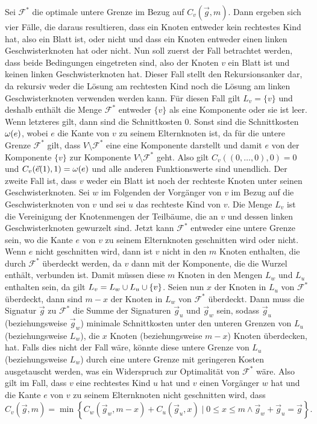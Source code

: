 Sei $\mathcal{F}^*$ die optimale untere Grenze im Bezug auf $C_v(\vec{g}, m)$. Dann ergeben sich vier Fälle, die daraus resultieren, dass ein Knoten entweder kein rechtestes Kind hat, also ein Blatt ist, oder nicht und dass ein Knoten entweder einen linken Geschwisterknoten hat oder nicht.
Nun soll zuerst der Fall betrachtet werden, dass beide Bedingungen eingetreten sind, also der Knoten $v$ ein Blatt ist und keinen linken Geschwisterknoten hat.
Dieser Fall stellt den Rekursionsanker dar, da rekursiv weder die Lösung am rechtesten Kind noch die Lösung am linken Geschwisterknoten verwenden werden kann.
Für diesen Fall gilt $L_v = \{v\}$ und deshalb enthält die Menge $\mathcal{F}^*$ entweder $\{v\}$ als eine Komponente oder sie ist leer.
Wenn letzteres gilt, dann sind die Schnittkosten $0$.
Sonst sind die Schnittkosten $\omega(e)$, wobei $e$ die Kante von $v$ zu seinem Elternknoten ist, da für die untere Grenze $\mathcal{F}^*$ gilt, dass $V \setminus \mathcal{F}^*$ eine eine Komponente darstellt und damit $e$ von der Komponente $\{v\}$ zur Komponente $V \setminus \mathcal{F}^*$ geht.
Also gilt $C_v((0,\ldots,0), 0) = 0$ und $C_v(\vec{e}(1), 1) = \omega(e)$ und alle anderen Funktionswerte sind unendlich.
Der zweite Fall ist, dass $v$ weder ein Blatt ist noch der rechteste Knoten unter seinen Geschwisterknoten. Sei $w$ im Folgenden der Vorgänger von $v$ im Bezug auf die Geschwisterknoten von $v$ und sei $u$ das rechteste Kind von $v$. 
Die Menge $L_v$ ist die Vereinigung der Knotenmengen der Teilbäume, die an $v$ und dessen linken Geschwisterknoten gewurzelt sind.
Jetzt kann $\mathcal{F}^*$ entweder eine untere Grenze sein, wo die Kante $e$ von $v$ zu seinem Elternknoten geschnitten wird oder nicht.
Wenn $e$ nicht geschnitten wird, dann ist $v$ nicht in den $m$ Knoten enthalten, die durch $\mathcal{F}^*$ überdeckt werden, da $v$ dann mit der Komponente, die die Wurzel enthält, verbunden ist.
Damit müssen diese $m$ Knoten in den Mengen $L_w$ und $L_u$ enthalten sein, da gilt $L_v = L_w \cup L_u \cup \{v\}$.
Seien nun $x$ der Knoten in $L_u$ von $\mathcal{F}^*$ überdeckt, dann sind $m - x$ der Knoten in $L_w$ von $\mathcal{F}^*$ überdeckt.
Dann muss die Signatur $\vec{g}$ zu $\mathcal{F}^*$ die Summe der Signaturen $\vec{g}_u$ und $\vec{g}_w$ sein, sodass $\vec{g}_u$ (beziehungsweise $\vec{g}_w$) minimale Schnittkosten unter den unteren Grenzen von $L_u$ (beziehungsweise $L_w$), die $x$ Knoten (beziehungsweise $m - x$) Knoten überdecken, hat.
Falls dies nicht der Fall wäre, könnte diese untere Grenze von $L_u$ (beziehungsweise $L_w$) durch eine untere Grenze mit geringeren Kosten ausgetauscht werden, was ein Widerspruch zur Optimalität von $\mathcal{F}^*$ wäre.
Also gilt im Fall, dass $v$ eine rechtestes Kind $u$ hat und $v$ einen Vorgänger $w$ hat und die Kante $e$ von $v$ zu seinem Elternknoten nicht geschnitten wird, dass 
\begin{equation}\label{eq:e_not_cut}
    C_v(\vec{g}, m) = \min \left\{ C_w(\vec{g}_w, m - x) + C_u(\vec{g}_u, x) \mid 0 \leq x \leq m \land \vec{g}_w + \vec{g}_u = \vec{g} \right\}.
\end{equation}

